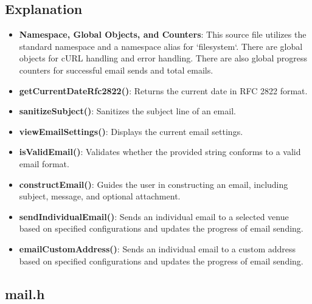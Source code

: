 \documentclass{article}
\begin{document}
	\subsection*{Explanation}
	\begin{itemize}
		\item \textbf{Namespace, Global Objects, and Counters}: This source file utilizes the standard namespace and a namespace alias for `filesystem`. There are global objects for cURL handling and error handling. There are also global progress counters for successful email sends and total emails.
		\item \textbf{getCurrentDateRfc2822()}: Returns the current date in RFC 2822 format.
		\item \textbf{sanitizeSubject()}: Sanitizes the subject line of an email.
		\item \textbf{viewEmailSettings()}: Displays the current email settings.
		\item \textbf{isValidEmail()}: Validates whether the provided string conforms to a valid email format.
		\item \textbf{constructEmail()}: Guides the user in constructing an email, including subject, message, and optional attachment.
		\item \textbf{sendIndividualEmail()}: Sends an individual email to a selected venue based on specified configurations and updates the progress of email sending.
		\item \textbf{emailCustomAddress()}: Sends an individual email to a custom address based on specified configurations and updates the progress of email sending.
	\end{itemize}
	
	\subsection{mail.h}
	
\end{document}
